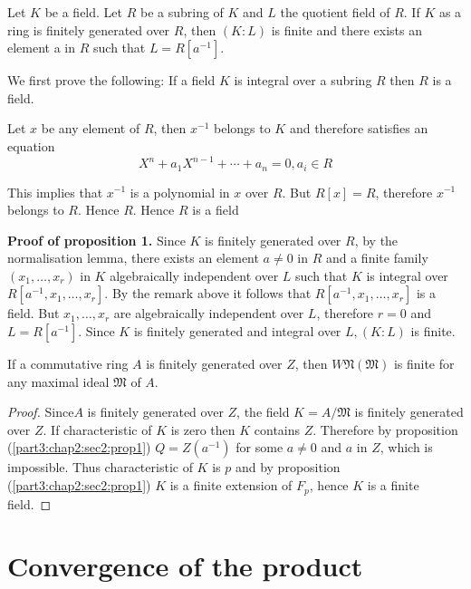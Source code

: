 \setcounter{proposition}{0}
\begin{proposition}\label{part3:chap2:sec2:prop1}
  Let $K$ be a field.  Let $R$ be a subring  of $K$ and $L$ the
  quotient field of $R$. If $K$ as a ring is finitely generated over
  $R$, then  $(K:L)$ is finite and there exists an element a in $R$
  such that  $L =R  [ a^{-1} ]$. 
 \end{proposition} 
 
 We first prove the following: If a field $K$ is integral over a
 subring $R$ then $R$ is a field. 
 
 Let $x$ be any element of $R$, then $x^{-1}$ belongs to $K$ and
 therefore satisfies an equation  
 $$
 X^n +a_1 X^{n-1}+ \cdots + a_n = 0, a_i \in R
 $$  
 
This implies that $x^{-1}$ is a polynomial in $x$ over $R$. But $R[
x]=R$, therefore $x^{-1}$ belongs to $R$. Hence $R$. Hence  $R$ is
a field 

\noindent \textbf{Proof of proposition 1.}
Since $K$ is finitely generated over $R$, by the normalisation
lemma,  there exists an element $a \neq 0$ in $R$ and a finite  family
$(x_1, \ldots,  x_r)$ in $K$ algebraically independent over $L$ such
that $K$ is integral over $R [ a^{-1}, x_1,  \ldots,  x_r ]$.  By the
remark above it follows that $R [ a^{-1}, x_1,  \ldots,  x_r ]$ is a field.  But
$x_1, \ldots,  x_r$ are algebraically independent over $L$, therefore
$r = 0$ and $L = R  [a^{-1} ]$. Since $K$ is finitely generated  and
integral over $L, (K:L)$ is finite.  

\begin{proposition}\label{part3:chap2:sec2:prop2}
  If a commutative ring $A$ is finitely generated over $Z$, then
  $W\mathfrak{N}(\mathfrak{M})$ is finite  for any maximal ideal
  $\mathfrak{M}$ of $A$.  
\end{proposition} 

\begin{proof}
  Since\pageoriginale $A$ is finitely generated over $Z$, the field  $K = A/
  \mathfrak{M}$ is finitely generated over  $Z$. If characteristic  of
  $K$ is zero  then $K$ contains $Z$. Therefore  by proposition
  (\ref{part3:chap2:sec2:prop1}) 
  $Q=Z(a^{-1})$ for some  $a \neq 0$ and  $a$ in $Z$, which is
  impossible.  Thus characteristic of $K$ is $p$ and by proposition
  (\ref{part3:chap2:sec2:prop1}) $K$ is a finite extension of $F_p$,
  hence $K$ is a finite field.   
\end{proof} 

\section{Convergence of the product}\label{part3:chap2:sec3}

